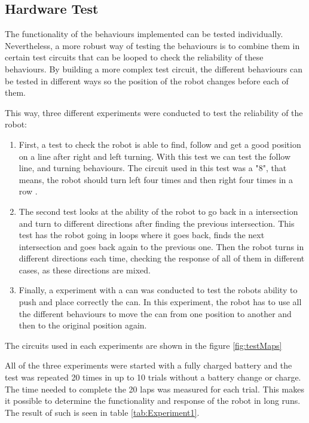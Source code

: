 
\subsection{Hardware Test}

The functionality of the behaviours implemented can be tested individually.
Nevertheless, a more robust way of testing the behaviours is to combine them in certain test circuits that can be looped to check the reliability of these behaviours.
By building a more complex test circuit, the different behaviours can be tested in different ways so the position of the robot changes before each of them.

This way, three different experiments were conducted to test the reliability of the robot:

\begin{enumerate}
	\item First, a test to check the robot is able to find, follow and get a good position on a line after right and left turning. 
With this test we can test the follow line, and turning behaviours.
The circuit used in this test was a "8", that means, the robot should turn left four times and then right four times in a row
.

	\item The second test looks at the ability of the robot to go back in a intersection and turn to different directions after finding the previous intersection.
This test has the robot going in loops where it goes back, finds the next intersection and goes back again to the previous one. 
Then the robot turns in different directions each time, checking the response of all of them in different cases, as these directions are mixed.

	\item Finally, a experiment with a can was conducted to test the robots ability to push and place correctly the can.
In this experiment, the robot has to use all the different behaviours to move the can from one position to another and then to the original position again.

\end{enumerate}

The circuits used in each experiments are shown in the figure \ref{fig:testMaps}

All of the three experiments were started with a fully charged battery and the test was repeated 20 times in up to 10 trials without a battery change or charge.
The time needed to complete the 20 laps was measured for each trial.
This makes it possible to determine the functionality and response of the robot in long runs.
The result of such is seen in table \ref{tab:Experiment1}.

